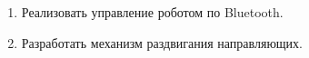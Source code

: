 \begin{enumerate}
\begin{enumerate}
	  \item Реализовать управление роботом по Bluetooth.\newline
	  
	  \item Разработать механизм раздвигания направляющих.\newline

    \end{enumerate}     
\end{enumerate}

\fillpage
